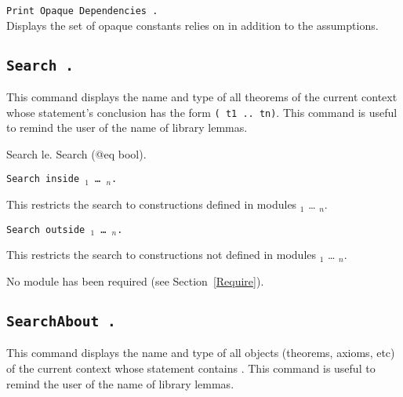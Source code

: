 \begin{Variants}
\item \texttt{\tt Print Opaque Dependencies {\qualid}.
  }\\
  Displays the set of opaque constants {\qualid} relies on in addition
  to the assumptions.
\end{Variants}

\subsection[\tt Search {\term}.]{\tt Search {\term}.}
This command displays the name and type of all theorems of the current
context whose statement's conclusion has the form {\tt ({\term} t1 ..
  tn)}.  This command is useful to remind the user of the name of
library lemmas.

\begin{coq_example}
Search le.
Search (@eq bool).
\end{coq_example}

\begin{Variants}
\item
{\tt Search {\term} inside {\module$_1$} \ldots{} {\module$_n$}.}

This restricts the search to constructions defined in modules
{\module$_1$} \ldots{} {\module$_n$}.

\item {\tt Search {\term} outside {\module$_1$} \ldots{} {\module$_n$}.}

This restricts the search to constructions not defined in modules
{\module$_1$} \ldots{} {\module$_n$}.

\begin{ErrMsgs}
\item {}
No module \module{} has been required (see Section~\ref{Require}).
\end{ErrMsgs}

\end{Variants}

\subsection[\tt SearchAbout {\qualid}.]{\tt SearchAbout {\qualid}.}
This command displays the name and type of all objects (theorems,
axioms, etc) of the current context whose statement contains \qualid.
This command is useful to remind the user of the name of library
lemmas.

